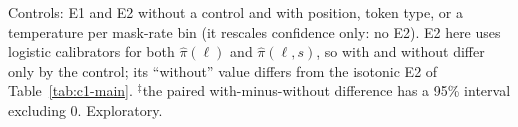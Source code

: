 \begin{table}[t]
  \centering
  \caption{Controls: E1 and E2 without a control and with position, token type, or a
    temperature per mask-rate bin (it rescales confidence only: no E2). E2 here
    uses logistic calibrators for both $\hat\pi(\ell)$ and $\hat\pi(\ell,s)$, so with and without
    differ only by the control; its ``without'' value differs from the isotonic E2 of
    Table~\ref{tab:c1-main}. $^\ddagger$the paired with-minus-without difference has a 95\%
    interval excluding 0. Exploratory.}
  \label{tab:c1-t8}
\end{table}
